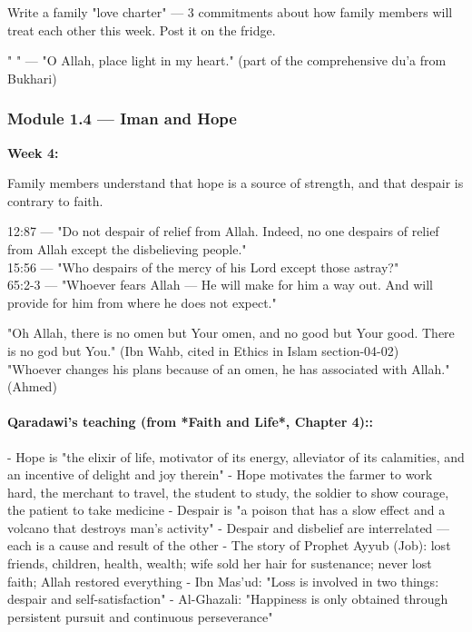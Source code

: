 \documentclass[11pt,a4paper]{article}
\begin{document}
\begin{activitybox} Write a family "love charter" --- 3 commitments about how family members will treat each other this week. Post it on the fridge. \end{activitybox}

\begin{duabox} "    " --- "O Allah, place light in my heart." (part of the comprehensive du'a from Bukhari) \end{duabox}

\vspace{6pt}\noindent{\color{border}\rule{\textwidth}{0.5pt}}\vspace{6pt}

\subsubsection*{Module 1.4 --- Iman and Hope}
\textbf{Week 4:} 

\begin{outcomebox} Family members understand that hope is a source of strength, and that despair is contrary to faith. \end{outcomebox}

\begin{quranbox} 12:87 --- "Do not despair of relief from Allah. Indeed, no one despairs of relief from Allah except the disbelieving people." \\ 15:56 --- "Who despairs of the mercy of his Lord except those astray?" \\ 65:2-3 --- "Whoever fears Allah --- He will make for him a way out. And will provide for him from where he does not expect." \end{quranbox}

\begin{hadithbox} "Oh Allah, there is no omen but Your omen, and no good but Your good. There is no god but You." (Ibn Wahb, cited in Ethics in Islam section-04-02) \\ "Whoever changes his plans because of an omen, he has associated with Allah." (Ahmed) \end{hadithbox}

\paragraph*{Qaradawi's teaching (from *Faith and Life*, Chapter 4)::}  - Hope is "the elixir of life, motivator of its energy, alleviator of its calamities, and an incentive of delight and joy therein" - Hope motivates the farmer to work hard, the merchant to travel, the student to study, the soldier to show courage, the patient to take medicine - Despair is "a poison that has a slow effect and a volcano that destroys man's activity" - Despair and disbelief are interrelated --- each is a cause and result of the other - The story of Prophet Ayyub (Job): lost friends, children, health, wealth; wife sold her hair for sustenance; never lost faith; Allah restored everything - Ibn Mas'ud: "Loss is involved in two things: despair and self-satisfaction" - Al-Ghazali: "Happiness is only obtained through persistent pursuit and continuous perseverance"
\end{document}
